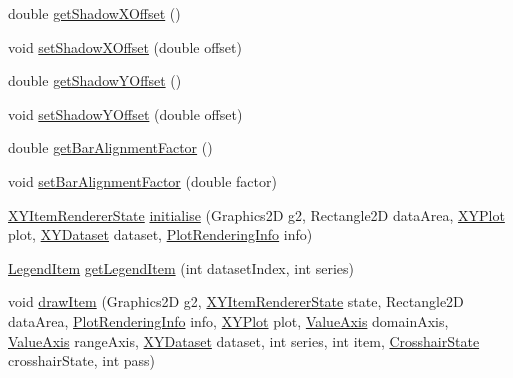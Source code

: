 \begin{DoxyCompactItemize}
\item 
double \mbox{\hyperlink{classorg_1_1jfree_1_1chart_1_1renderer_1_1xy_1_1_x_y_bar_renderer_a241ae4faf401e4daf338157ff63d49c7}{get\+Shadow\+X\+Offset}} ()
\item 
void \mbox{\hyperlink{classorg_1_1jfree_1_1chart_1_1renderer_1_1xy_1_1_x_y_bar_renderer_a22720779ca6dd4cf627e68c89045ff1d}{set\+Shadow\+X\+Offset}} (double offset)
\item 
double \mbox{\hyperlink{classorg_1_1jfree_1_1chart_1_1renderer_1_1xy_1_1_x_y_bar_renderer_aa85849676bc4c10be6f2fabc18cead9f}{get\+Shadow\+Y\+Offset}} ()
\item 
void \mbox{\hyperlink{classorg_1_1jfree_1_1chart_1_1renderer_1_1xy_1_1_x_y_bar_renderer_a026c8212fcf14adaf78c724e0fa1d878}{set\+Shadow\+Y\+Offset}} (double offset)
\item 
double \mbox{\hyperlink{classorg_1_1jfree_1_1chart_1_1renderer_1_1xy_1_1_x_y_bar_renderer_a06bc29edec347eceddb15378b7f4bfa5}{get\+Bar\+Alignment\+Factor}} ()
\item 
void \mbox{\hyperlink{classorg_1_1jfree_1_1chart_1_1renderer_1_1xy_1_1_x_y_bar_renderer_a8772c2673d4f53fa0801fcc2db7915d2}{set\+Bar\+Alignment\+Factor}} (double factor)
\item 
\mbox{\hyperlink{classorg_1_1jfree_1_1chart_1_1renderer_1_1xy_1_1_x_y_item_renderer_state}{X\+Y\+Item\+Renderer\+State}} \mbox{\hyperlink{classorg_1_1jfree_1_1chart_1_1renderer_1_1xy_1_1_x_y_bar_renderer_a67f97116714f551bfac4ff00170bfca8}{initialise}} (Graphics2D g2, Rectangle2D data\+Area, \mbox{\hyperlink{classorg_1_1jfree_1_1chart_1_1plot_1_1_x_y_plot}{X\+Y\+Plot}} plot, \mbox{\hyperlink{interfaceorg_1_1jfree_1_1data_1_1xy_1_1_x_y_dataset}{X\+Y\+Dataset}} dataset, \mbox{\hyperlink{classorg_1_1jfree_1_1chart_1_1plot_1_1_plot_rendering_info}{Plot\+Rendering\+Info}} info)
\item 
\mbox{\hyperlink{classorg_1_1jfree_1_1chart_1_1_legend_item}{Legend\+Item}} \mbox{\hyperlink{classorg_1_1jfree_1_1chart_1_1renderer_1_1xy_1_1_x_y_bar_renderer_a3e7196fa9c8e08e7ac1b3f602dd3059b}{get\+Legend\+Item}} (int dataset\+Index, int series)
\item 
void \mbox{\hyperlink{classorg_1_1jfree_1_1chart_1_1renderer_1_1xy_1_1_x_y_bar_renderer_a3a32231ead2940a192d7966cd06e4a97}{draw\+Item}} (Graphics2D g2, \mbox{\hyperlink{classorg_1_1jfree_1_1chart_1_1renderer_1_1xy_1_1_x_y_item_renderer_state}{X\+Y\+Item\+Renderer\+State}} state, Rectangle2D data\+Area, \mbox{\hyperlink{classorg_1_1jfree_1_1chart_1_1plot_1_1_plot_rendering_info}{Plot\+Rendering\+Info}} info, \mbox{\hyperlink{classorg_1_1jfree_1_1chart_1_1plot_1_1_x_y_plot}{X\+Y\+Plot}} plot, \mbox{\hyperlink{classorg_1_1jfree_1_1chart_1_1axis_1_1_value_axis}{Value\+Axis}} domain\+Axis, \mbox{\hyperlink{classorg_1_1jfree_1_1chart_1_1axis_1_1_value_axis}{Value\+Axis}} range\+Axis, \mbox{\hyperlink{interfaceorg_1_1jfree_1_1data_1_1xy_1_1_x_y_dataset}{X\+Y\+Dataset}} dataset, int series, int item, \mbox{\hyperlink{classorg_1_1jfree_1_1chart_1_1plot_1_1_crosshair_state}{Crosshair\+State}} crosshair\+State, int pass)

\end{DoxyCompactItemize}
